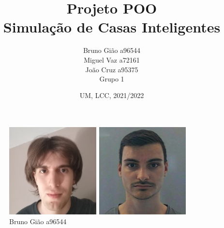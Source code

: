 \documentclass[10pt, a4paper]{article}
\title{Projeto POO\\
        Simulação de Casas Inteligentes}
\author{Bruno Gião a96544 \\ Miguel Vaz a72161 \\ João Cruz a95375 \\ Grupo 1}
\date{UM, LCC, 2021/2022}
\begin{document}
\maketitle
\begin{figure}[!htb]
\begin{minipage}{0.33\textwidth}
        \centering
        \includegraphics[width=\linewidth]{Bruno.png}
        \caption{Bruno Gião a96544}
\end{minipage}
\begin{minipage}{0.33\textwidth}
        \centering
        \includegraphics[width=\linewidth]{Joao.png}

\end{minipage}
\end{figure}
\end{document}
